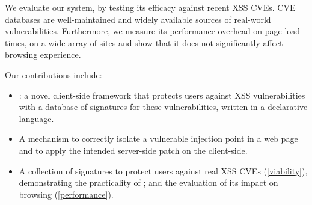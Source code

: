 We evaluate our system, by
testing its efficacy against recent \ac{XSS} CVEs. CVE databases are
well-maintained and widely available sources of real-world vulnerabilities.
Furthermore, we measure its performance overhead on page load times,
on a wide array of sites and show that it does not significantly
affect browsing experience.

Our contributions include: 
\begin{itemize}

	\item \sys: a novel client-side framework that protects
          users against XSS vulnerabilities with a database of
          signatures for these vulnerabilities, written in a
          declarative language.

	\item A mechanism to correctly isolate a vulnerable injection
          point in a web page and to apply the intended server-side
          patch on the client-side.

	\item A collection of signatures to protect users against
          real XSS CVEs (\autoref{viability}), demonstrating the practicality
          of \sys; and the evaluation of its impact on browsing (\autoref{performance}). %

\end{itemize}
